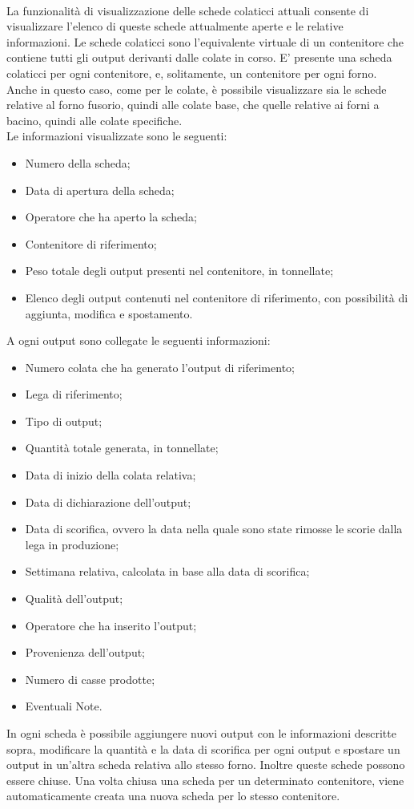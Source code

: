   \paragraph{}
  La funzionalità di visualizzazione delle schede colaticci attuali consente di visualizzare l’elenco 
  di queste schede attualmente aperte e le relative informazioni. Le schede colaticci sono 
  l’equivalente virtuale di un contenitore che contiene tutti gli output derivanti dalle colate in corso. 
  E’ presente una scheda colaticci per ogni contenitore, e, solitamente, un contenitore per ogni forno. 
  Anche in questo caso, come per le colate, è possibile visualizzare sia le schede relative al forno fusorio, 
  quindi alle colate base, che quelle relative ai forni a bacino, quindi alle colate specifiche.\\
  Le informazioni visualizzate sono le seguenti:
  \begin{itemize}
    \item Numero della scheda;
    \item Data di apertura della scheda;
    \item Operatore che ha aperto la scheda;
    \item Contenitore di riferimento;
    \item Peso totale degli output presenti nel contenitore, in tonnellate;
    \item Elenco degli output contenuti nel contenitore di riferimento, con possibilità di aggiunta, modifica e spostamento.
  \end{itemize}
  A ogni output sono collegate le seguenti informazioni:
  \begin{itemize}
    \item Numero colata che ha generato l’output di riferimento;
    \item Lega di riferimento;
    \item Tipo di output;
    \item Quantità totale generata, in tonnellate;
    \item Data di inizio della colata relativa;
    \item Data di dichiarazione dell’output;
    \item Data di scorifica, ovvero la data nella quale sono state rimosse le scorie dalla lega in produzione;
    \item Settimana relativa, calcolata in base alla data di scorifica;
    \item Qualità dell’output;
    \item Operatore che ha inserito l’output;
    \item Provenienza dell’output;
    \item Numero di casse prodotte;
    \item Eventuali Note.    
  \end{itemize}
  In ogni scheda è possibile aggiungere nuovi output con le informazioni descritte sopra, modificare 
  la quantità e la data di scorifica per ogni output e spostare un output in un’altra scheda relativa 
  allo stesso forno. Inoltre queste schede possono essere chiuse. Una volta chiusa una scheda per un 
  determinato contenitore, viene automaticamente creata una nuova scheda per lo stesso contenitore. 

